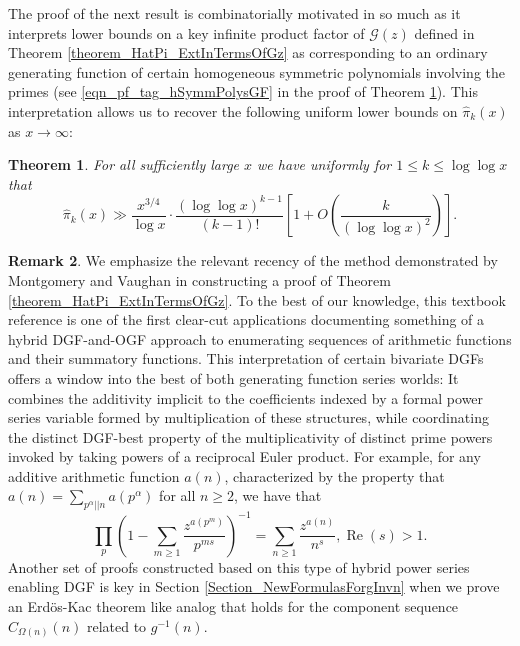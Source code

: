 \documentclass[11pt,reqno,a4letter]{article}
\numberwithin{figure}{section}
\numberwithin{table}{section}
\newcommand{\cf}{\textit{cf.\ }}
\theoremstyle{plain}
\newtheorem{theorem}{Theorem}
\numberwithin{theorem}{section}
\theoremstyle{definition}
\newtheorem{remark}[theorem]{Remark}
\renewcommand{\Re}{\operatorname{Re}}
\begin{document}
The proof of the next result is combinatorially motivated in so much as it interprets 
lower bounds on a key infinite product factor of $\mathcal{G}(z)$ defined in 
Theorem \ref{theorem_HatPi_ExtInTermsOfGz} 
as corresponding to an ordinary generating function of certain 
homogeneous symmetric polynomials involving the primes 
(see \eqref{eqn_pf_tag_hSymmPolysGF} in the proof of 
Theorem \ref{theorem_GFs_SymmFuncs_SumsOfRecipOfPowsOfPrimes}). 
This interpretation allows us to recover the 
following uniform lower bounds on $\widehat{\pi}_k(x)$ as $x \rightarrow \infty$: 

\begin{theorem} 
\label{theorem_GFs_SymmFuncs_SumsOfRecipOfPowsOfPrimes} 
\label{cor_BoundsOnGz_FromMVBook_initial_stmt_v1} 
For all sufficiently large $x$ we have uniformly for $1 \leq k \leq \log\log x$ that 
\[
\widehat{\pi}_k(x) \gg 
     \frac{x^{3/4}}{\log x} \cdot 
     \frac{(\log\log x)^{k-1}}{(k-1)!} \left[1 + 
     O\left(\frac{k}{(\log\log x)^2}\right)\right]. 
\]
\end{theorem} 

\begin{remark} 
\label{remark_MV_NewDGFApplications} 
We emphasize the relevant recency of the method demonstrated by 
Montgomery and Vaughan in constructing a proof of 
Theorem \ref{theorem_HatPi_ExtInTermsOfGz}. 
To the best of our knowledge, this textbook reference is 
one of the first clear-cut applications documenting something of a hybrid 
DGF-and-OGF approach to enumerating sequences of arithmetic functions 
and their summatory functions. 
This interpretation of certain bivariate DGFs 
offers a window into the best of both generating function series worlds: 
It combines the additivity 
implicit to the coefficients indexed by a formal power series variable formed by 
multiplication of these structures, while coordinating the distinct DGF-best 
property of the multiplicativity of distinct prime powers invoked 
by taking powers of a reciprocal Euler product. 
For example, for any additive arithmetic function $a(n)$, 
characterized by the property that 
$a(n) = \sum_{p^{\alpha} || n} a(p^{\alpha})$ for all $n \geq 2$, we have that 
\cite[\cf \S 1.7]{IWANIEC-KOWALSKI} 
\[
\prod_p \left( 
     1 - \sum_{m \geq 1} \frac{z^{a(p^m)}}{p^{ms}}\right)^{-1} = 
     \sum_{n \geq 1} \frac{z^{a(n)}}{n^s}, \Re(s) > 1. 
\]
Another set of proofs constructed based on this type of hybrid power series enabling 
DGF is key in Section \ref{Section_NewFormulasForgInvn} 
when we prove an Erd\"os-Kac theorem like analog 
that holds for the component sequence $C_{\Omega(n)}(n)$ related to $g^{-1}(n)$. 
\end{remark} 
\end{document}
